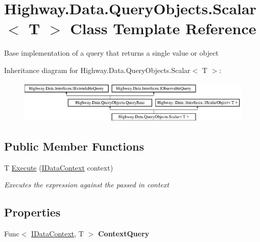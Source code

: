 \hypertarget{class_highway_1_1_data_1_1_query_objects_1_1_scalar-g}{\section{Highway.\-Data.\-Query\-Objects.\-Scalar$<$ T $>$ Class Template Reference}
\label{class_highway_1_1_data_1_1_query_objects_1_1_scalar-g}
}


Base implementation of a query that returns a single value or object  


Inheritance diagram for Highway.\-Data.\-Query\-Objects.\-Scalar$<$ T $>$\-:\begin{figure}[H]
\begin{center}
\leavevmode
\includegraphics[height=2.021661cm]{class_highway_1_1_data_1_1_query_objects_1_1_scalar-g}
\end{center}
\end{figure}
\subsection*{Public Member Functions}
\begin{DoxyCompactItemize}
\item 
T \hyperlink{class_highway_1_1_data_1_1_query_objects_1_1_scalar-g_aff12d516dd21701d1f48c9fb370c5683}{Execute} (\hyperlink{interface_highway_1_1_data_1_1_interfaces_1_1_i_data_context}{I\-Data\-Context} context)
\begin{DoxyCompactList}\small\item\em Executes the expression against the passed in context \end{DoxyCompactList}\end{DoxyCompactItemize}
\subsection*{Properties}
\begin{DoxyCompactItemize}
\item 
\hypertarget{class_highway_1_1_data_1_1_query_objects_1_1_scalar-g_acb183b773f6c4bb8c9a989c1144095db}{Func$<$ \hyperlink{interface_highway_1_1_data_1_1_interfaces_1_1_i_data_context}{I\-Data\-Context}, T $>$ {\bfseries Context\-Query}}\label{class_highway_1_1_data_1_1_query_objects_1_1_scalar-g_acb183b773f6c4bb8c9a989c1144095db}

\end{DoxyCompactItemize}
